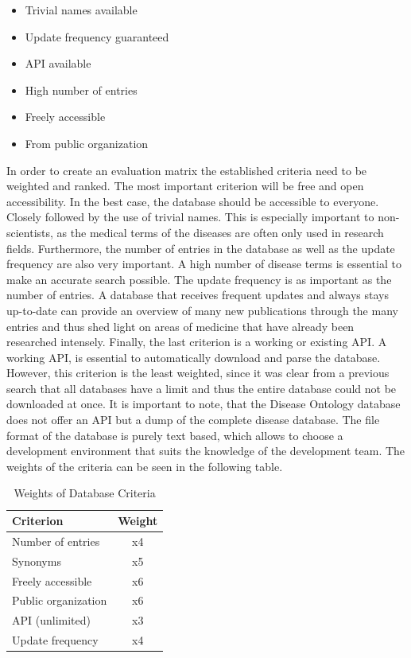 \begin{itemize} 
\item Trivial names available 
\item Update frequency guaranteed 
\item \ac{API} available 
\item High number of entries 
\item Freely accessible
\item From public organization
\end{itemize}

In order to create an evaluation matrix the established criteria need to be weighted and ranked. The most important criterion will be free and open accessibility. In the best case, the database should be accessible to everyone. Closely followed by the use of trivial names. This is especially important to non-scientists, as the medical terms of the diseases are often only used in research fields. Furthermore, the number of entries in the database as well as the update frequency are also very important. A high number of disease terms is essential to make an accurate search possible. The update frequency is as important as the number of entries. A database that receives frequent updates and always stays up-to-date can provide an overview of many new publications through the many entries and thus shed light on areas of medicine that have already been researched intensely. Finally, the last criterion is a working or existing \ac{API}. A working API, is essential to automatically download and parse the database. However, this criterion is the least weighted, since it was clear from a previous search that all databases have a limit and thus the entire database could not be downloaded at once. It is important to note, that the Disease Ontology database does not offer an API but a dump of the complete disease database. The file format of the database is purely text based, which allows to choose a development environment that suits the knowledge of the development team. The weights of the criteria can be seen in the following table. 

\begin{table}[h]
\centering
\begin{tabular}{|l|c|}
\hline
\textbf{Criterion}   & \multicolumn{1}{l|}{\textbf{Weight}} \\ \hline
Number of entries    & x4                                   \\ \hline
Synonyms             & x5                                   \\ \hline
Freely accessible    & x6                                   \\ \hline
Public organization  & x6                                   \\ \hline
API (unlimited) & x3                                   \\ \hline
Update frequency     & x4                                   \\ \hline
\end{tabular}
\caption{Weights of Database Criteria}
\end{table}

